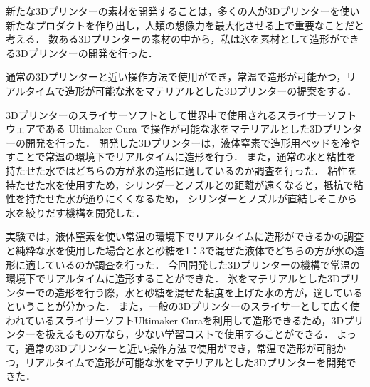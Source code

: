 新たな3Dプリンターの素材を開発することは，多くの人が3Dプリンターを使い新たなプロダクトを作り出し，人類の想像力を最大化させる上で重要なことだと考える．
数ある3Dプリンターの素材の中から，私は氷を素材として造形ができる3Dプリンターの開発を行った．

通常の3Dプリンターと近い操作方法で使用ができ，常温で造形が可能かつ，リアルタイムで造形が可能な氷をマテリアルとした3Dプリンターの提案をする．

3Dプリンターのスライサーソフトとして世界中で使用されるスライサーソフトウェアである Ultimaker Cura で操作が可能な氷をマテリアルとした3Dプリンターの開発を行った．
開発した3Dプリンターは，液体窒素で造形用ベッドを冷やすことで常温の環境下でリアルタイムに造形を行う．
また，通常の水と粘性を持たせた水ではどちらの方が氷の造形に適しているのか調査を行った．
粘性を持たせた水を使用すため，シリンダーとノズルとの距離が遠くなると，抵抗で粘性を持たせた水が通りにくくなるため，
シリンダーとノズルが直結しそこから水を絞りだす機構を開発した．

実験では，液体窒素を使い常温の環境下でリアルタイムに造形ができるかの調査と純粋な水を使用した場合と水と砂糖を1：3で混ぜた液体でどちらの方が氷の造形に適しているのか調査を行った．
今回開発した3Dプリンターの機構で常温の環境下でリアルタイムに造形することができた．
氷をマテリアルとした3Dプリンターでの造形を行う際，水と砂糖を混ぜた粘度を上げた水の方が，適しているということが分かった．
また，一般の3Dプリンターのスライサーとして広く使われているスライサーソフトUltimaker Curaを利用して造形できるため，3Dプリンターを扱えるもの方なら，少ない学習コストで使用することができる．
よって，通常の3Dプリンターと近い操作方法で使用ができ，常温で造形が可能かつ，リアルタイムで造形が可能な氷をマテリアルとした3Dプリンターを開発できた．
